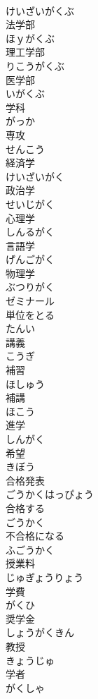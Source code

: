 \documentclass[8pt]{extreport}
\begin{document}
\begin{CJK}{UTF8}{min}
\\	けいざいがくぶ
\\	法学部	
\\	ほｙがくぶ
\\	理工学部	
\\	りこうがくぶ
\\	医学部	
\\	いがくぶ
\\	学科	
\\	がっか
\\	専攻	
\\	せんこう
\\	経済学	
\\	けいざいがく
\\	政治学	
\\	せいじがく
\\	心理学	
\\	しんるがく
\\	言語学	
\\	げんごがく
\\	物理学	
\\	ぶつりがく
\\	ゼミナール	
\\	単位をとる	
\\	たんい
\\	講義	
\\	こうぎ
\\	補習	
\\	ほしゅう
\\	補講	
\\	ほこう
\\	進学	
\\	しんがく
\\	希望	
\\	きぼう
\\	合格発表	
\\	ごうかくはっぴょう
\\	合格する	
\\	ごうかく
\\	不合格になる	
\\	ふごうかく
\\	授業料	
\\	じゅぎょうりょう
\\	学費	
\\	がくひ
\\	奨学金	
\\	しょうがくきん
\\	教授	
\\	きょうじゅ
\\	学者	
\\	がくしゃ

\end{CJK}
\end{document}
